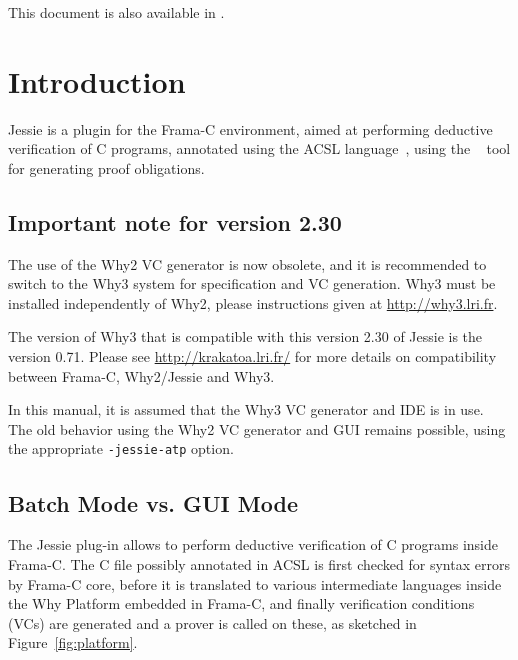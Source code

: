 \documentclass[a4paper,11pt,twoside,openright]{report}
\begin{document}
\ifhevea%
This document is also available in .
\else
\sloppy
{}
\fi


\tableofcontents

\chapter{Introduction}

Jessie is a plugin for the Frama-C environment, aimed at performing
deductive verification of C programs, annotated using the ACSL
language~\cite{baudin09acsl}, using the \Why{}~\cite{why} tool for
generating proof obligations.

\section{Important note for version 2.30}

The use of the Why2 VC generator is now obsolete, and it is
recommended to switch to the Why3 system for specification and VC
generation. Why3 must be installed independently of Why2, please
instructions given at \url{http://why3.lri.fr}.

The version of Why3 that is compatible with this version 2.30 of Jessie
is the version 0.71. Please see \url{http://krakatoa.lri.fr/} for more
details on compatibility between Frama-C, Why2/Jessie and Why3.

In this manual, it is assumed that the Why3 VC generator and IDE is in
use.  The old behavior using the Why2 VC generator and GUI remains
possible, using the appropriate \texttt{-jessie-atp} option.

\section{Batch Mode vs. GUI Mode}

The Jessie plug-in allows to perform deductive verification of C
programs inside Frama-C. The C file possibly annotated in ACSL is
first checked for syntax errors by Frama-C core, before it is
translated to various intermediate languages inside the Why Platform
embedded in Frama-C, and finally verification conditions (VCs) are
generated and a prover is called on these, as sketched in
Figure~\ref{fig:platform}.
\end{document}

